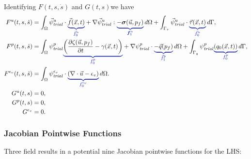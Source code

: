 Identifying $F(t,s,\dot{s})$ and $G(t,s)$we have
\begin{align}
  F^u(t,s,\dot{s})              & = \int_\Omega \trialvec[u] \cdot \eqnannotate{\vec{f}(\vec{x},t)}{\vec{f}^u_0}
  + \nabla \trialvec[u] : \eqnannotate{-\tensor{\sigma}(\vec{u},p_f)}{\tensor{f}^u_1} \, d\Omega
  + \int_{\Gamma_\tau} \trialvec[u] \cdot \eqnannotate{\vec{\tau}(\vec{x},t)}{\vec{f}^u_0} \, d\Gamma,                                                                               \\
  F^p(t,s,\dot{s})              & = \int_\Omega  \trialscalar[p] \eqnannotate{\left(\frac{\partial \zeta(\vec{u},p_f)}{\partial t} - \gamma(\vec{x},t)\right)} {f^p_0}
  + \nabla \trialscalar[p] \cdot \eqnannotate{-\vec{q}(p_f)}{\vec{f}^p_1} \, d\Omega
  + \int_{\Gamma_q} \trialscalar[p] \eqnannotate{\left(q_0(\vec{x},t)\right)}{f^p_0} \, d\Gamma,                                                                                                \\
  F^{\epsilon_{v}}(t,s,\dot{s}) & = \int_{\Omega} \trialscalar[\epsilon_{v}] \cdot \eqnannotate{\left(\nabla \cdot \vec{u} - \epsilon_{v} \right)}{f^{\epsilon_{v}}_{0}} \, d\Omega. \\
  G^u(t,s)                      & = 0,                                                                                                                                               \\
  G^p(t,s)                      & = 0,                                                                                                                                               \\
  G^{\epsilon_v}                & = 0.
\end{align}

\subsubsection{Jacobian Pointwise Functions}

Three field results in a potential nine Jacobian pointwise functions for the LHS:

